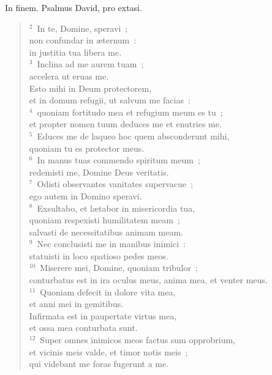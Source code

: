 \bchapter
\lettrine[lines=3,image=true,loversize=0.05,lraise=-0.03]{I}{}n finem. Psalmus David, pro extasi.
\begin{flushleft}\begin{verse}\vspace{6pt}${}^{2}$~In te, Domine, speravi~;\\ non confundar in \ae ternum~:\\ in justitia tua libera me.\\
${}^{3}$~Inclina ad me aurem tuam~;\\ accelera ut eruas me.\\ Esto mihi in Deum protectorem,\\ et in domum refugii, ut salvum me facias~:\\
${}^{4}$~quoniam fortitudo mea et refugium meum es tu~;\\ et propter nomen tuum deduces me et enutries me.\\
${}^{5}$~Educes me de laqueo hoc quem absconderunt mihi,\\ quoniam tu es protector meus.\\
${}^{6}$~In manus tuas commendo spiritum meum~;\\ redemisti me, Domine Deus veritatis.\\
${}^{7}$~Odisti observantes vanitates supervacue~;\\ ego autem in Domino speravi.\\
${}^{8}$~Exsultabo, et l\ae tabor in misericordia tua,\\ quoniam respexisti humilitatem meam~;\\ salvasti de necessitatibus animam meam.\\
${}^{9}$~Nec conclusisti me in manibus inimici~:\\ statuisti in loco spatioso pedes meos.\\
${}^{10}$~Miserere mei, Domine, quoniam tribulor~;\\ conturbatus est in ira oculus meus, anima mea, et venter meus.\\
${}^{11}$~Quoniam defecit in dolore vita mea,\\ et anni mei in gemitibus.\\ Infirmata est in paupertate virtus mea,\\ et ossa mea conturbata sunt.\\
${}^{12}$~Super omnes inimicos meos factus sum opprobrium,\\ et vicinis meis valde, et timor notis meis~;\\ qui videbant me foras fugerunt a me.\\

\end{verse}
\end{flushleft}
